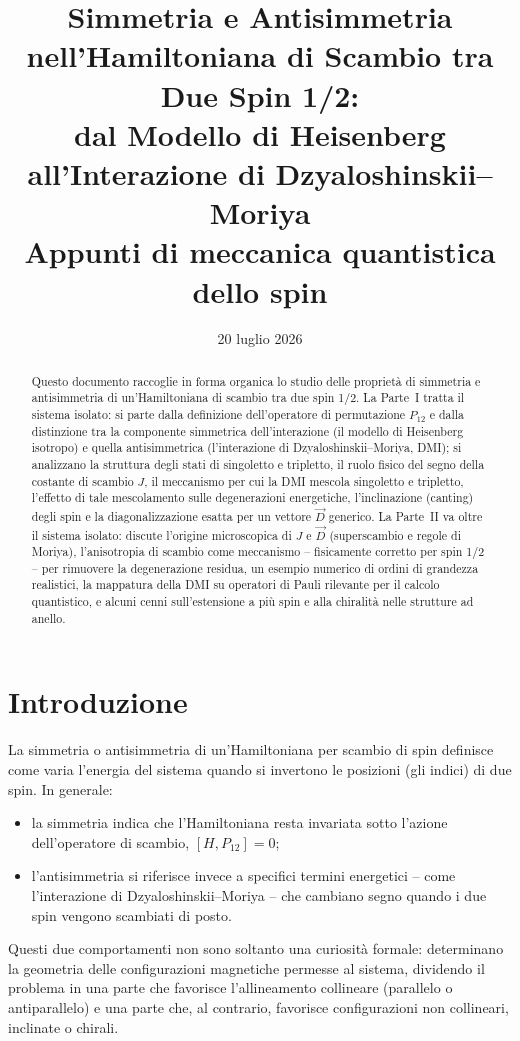 \documentclass[11pt,a4paper]{article}
\title{Simmetria e Antisimmetria nell'Hamiltoniana di Scambio tra Due Spin 1/2:\\
dal Modello di Heisenberg all'Interazione di Dzyaloshinskii--Moriya\\[6pt]
\large Appunti di meccanica quantistica dello spin}
\author{}
\date{20 luglio 2026}
\begin{document}
\maketitle

\begin{abstract}
\noindent Questo documento raccoglie in forma organica lo studio delle propriet\`a di
simmetria e antisimmetria di un'Hamiltoniana di scambio tra due spin 1/2. La Parte~I
tratta il sistema isolato: si parte dalla definizione dell'operatore di permutazione
$P_{12}$ e dalla distinzione tra la componente simmetrica dell'interazione (il modello
di Heisenberg isotropo) e quella antisimmetrica (l'interazione di
Dzyaloshinskii--Moriya, DMI); si analizzano la struttura degli stati di singoletto e
tripletto, il ruolo fisico del segno della costante di scambio $J$, il meccanismo per
cui la DMI mescola singoletto e tripletto, l'effetto di tale mescolamento sulle
degenerazioni energetiche, l'inclinazione (canting) degli spin e la diagonalizzazione
esatta per un vettore $\vec D$ generico. La Parte~II va oltre il sistema isolato:
discute l'origine microscopica di $J$ e $\vec D$ (superscambio e regole di Moriya),
l'anisotropia di scambio come meccanismo -- fisicamente corretto per spin 1/2 -- per
rimuovere la degenerazione residua, un esempio numerico di ordini di grandezza
realistici, la mappatura della DMI su operatori di Pauli rilevante per il calcolo
quantistico, e alcuni cenni sull'estensione a pi\`u spin e alla chiralit\`a nelle
strutture ad anello.
\end{abstract}

\tableofcontents

\section{Introduzione}

La simmetria o antisimmetria di un'Hamiltoniana per scambio di spin definisce come
varia l'energia del sistema quando si invertono le posizioni (gli indici) di due spin.
In generale:
\begin{itemize}
\item la simmetria indica che l'Hamiltoniana resta invariata sotto l'azione
dell'operatore di scambio, $[H,P_{12}]=0$;
\item l'antisimmetria si riferisce invece a specifici termini energetici -- come
l'interazione di Dzyaloshinskii--Moriya -- che cambiano segno quando i due spin vengono
scambiati di posto.
\end{itemize}
Questi due comportamenti non sono soltanto una curiosit\`a formale: determinano la
geometria delle configurazioni magnetiche permesse al sistema, dividendo il problema in
una parte che favorisce l'allineamento collineare (parallelo o antiparallelo) e una
parte che, al contrario, favorisce configurazioni non collineari, inclinate o chirali.
\end{document}
